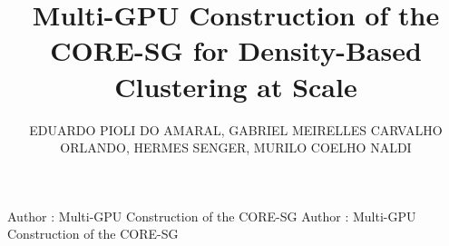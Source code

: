 \documentclass{ieeeaccess}
\begin{document}

\title{Multi-GPU Construction of the CORE-SG for Density-Based
Clustering at Scale}

\author{\uppercase{Eduardo Pioli do Amaral},
\uppercase{Gabriel Meirelles Carvalho Orlando},
\uppercase{Hermes Senger},
\uppercase{Murilo Coelho Naldi}}

\address[1]{Department of Computing (DC), Federal University of São Carlos (UFSCar), São Carlos, São Paulo 13565-905, Brazil}
\address[2]{Institute of Mathematical and Computing Sciences (ICMC), University of São Paulo (USP), São Carlos, São Paulo 13566-590, Brazil}


\markboth
{Author \headeretal: Multi-GPU Construction of the CORE-SG}
{Author \headeretal: Multi-GPU Construction of the CORE-SG}

\end{document}
